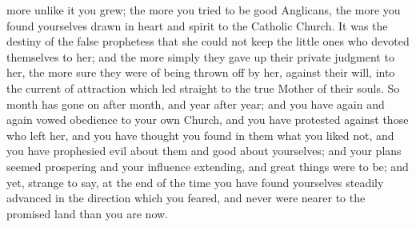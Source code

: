 more unlike it you grew; the more you tried to be good Anglicans, the
more you found yourselves drawn in heart and spirit to the Catholic
Church. It was the destiny of the false prophetess that she could not
keep the little ones who devoted themselves to her; and the more
simply they gave up their private judgment to her, the more sure they
were of being thrown off by her, against their will, into the current
of attraction which led straight to the true Mother of their souls. So
month has gone on after month, and year after year; and you have again
and again vowed obedience to your own Church, and you have protested
against those who left her, and you have thought you found in them
what you liked not, and you have prophesied evil about them and good
about yourselves; and your plans seemed prospering and your influence
extending, and great things were to be; and yet, strange to say, at
the end of the time you have found yourselves steadily advanced in the
direction which you feared, and never were nearer to the promised land
than you are now.

